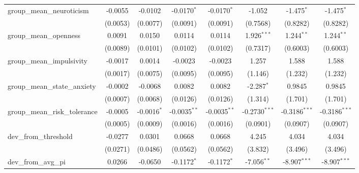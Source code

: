 \begin{tabular}{lccccccc}
   group\_mean\_neuroticism         & -0.0055               & -0.0102        & -0.0170$^{*}$   & -0.0170$^{*}$   & -1.052          & -1.475$^{*}$    & -1.475$^{*}$\\   
                                    & (0.0053)              & (0.0077)       & (0.0091)        & (0.0091)        & (0.7568)        & (0.8282)        & (0.8282)\\   
   group\_mean\_openness            & 0.0091                & 0.0150         & 0.0114          & 0.0114          & 1.926$^{***}$   & 1.244$^{**}$    & 1.244$^{**}$\\   
                                    & (0.0089)              & (0.0101)       & (0.0102)        & (0.0102)        & (0.7317)        & (0.6003)        & (0.6003)\\   
   group\_mean\_impulsivity         & -0.0017               & 0.0014         & -0.0023         & -0.0023         & 1.257           & 1.588           & 1.588\\   
                                    & (0.0017)              & (0.0075)       & (0.0095)        & (0.0095)        & (1.146)         & (1.232)         & (1.232)\\   
   group\_mean\_state\_anxiety      & -0.0002               & -0.0068        & 0.0082          & 0.0082          & -2.287$^{*}$    & 0.9845          & 0.9845\\   
                                    & (0.0007)              & (0.0068)       & (0.0126)        & (0.0126)        & (1.314)         & (1.701)         & (1.701)\\   
   group\_mean\_risk\_tolerance     & -0.0005               & -0.0016$^{*}$  & -0.0035$^{**}$  & -0.0035$^{**}$  & -0.2730$^{***}$ & -0.3186$^{***}$ & -0.3186$^{***}$\\   
                                    & (0.0005)              & (0.0009)       & (0.0016)        & (0.0016)        & (0.0901)        & (0.0907)        & (0.0907)\\   
   dev\_from\_threshold             & -0.0277               & 0.0301         & 0.0668          & 0.0668          & 4.245           & 4.034           & 4.034\\   
                                    & (0.0271)              & (0.0486)       & (0.0562)        & (0.0562)        & (3.832)         & (3.496)         & (3.496)\\   
   dev\_from\_avg\_pi               & 0.0266                & -0.0650        & -0.1172$^{*}$   & -0.1172$^{*}$   & -7.056$^{**}$   & -8.907$^{***}$  & -8.907$^{***}$\\   

\end{tabular}
